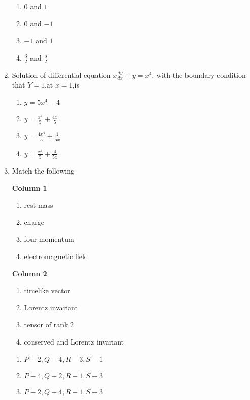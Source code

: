 \documentclass[journal]{IEEEtran}
\begin{document}
\begin{enumerate}[start=18]
    \begin{enumerate}
        \item $0$ and $1$
        \item $0$ and $-1$
        \item $-1$ and $1$
        \item $\frac{3}{2}$ and $\frac{5}{2}$
    \end{enumerate}
    \item Solution of differential equation $x\frac{dy}{dx}+y=x^4$, with the boundary condition that $Y=1$,at $x=1$,is
    \begin{enumerate}
        \item $y=5x^4-4$
        \item $y=\frac{x^4}{5}+\frac{4x}{5}$
        \item $y=\frac{4x^4}{5}+\frac{1}{5x}$
        \item $y=\frac{x^4}{5}+\frac{4}{5x}$
    \end{enumerate}
    \item Match the following\\
\begin{minipage}[t]{0.32\textwidth}
     \textbf{Column 1}\\
     \begin{enumerate}[label=(\Alph*)]
     \item rest mass
     \item charge
     \item four-momentum
     \item electromagnetic field
 \end{enumerate}
     \end{minipage}
     \hfill
\begin{minipage}[t]{0.32\textwidth}
    \textbf{Column 2}\\
    \begin{enumerate}[label=(\alph*), start=16]
    \item timelike vector
    \item Lorentz invariant
    \item tensor of rank $2$
    \item conserved and Lorentz invariant
\end{enumerate}
\end{minipage}
    \begin{enumerate}
        \item $P-2,Q-4,R-3,S-1$
        \item $P-4,Q-2,R-1,S-3$
        \item $P-2,Q-4,R-1,S-3$

\end{enumerate}
\end{enumerate}
\end{document}
